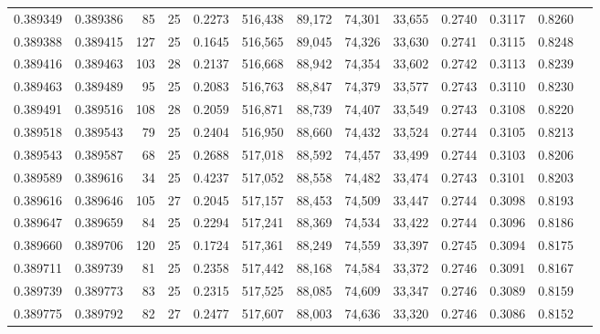 \begin{tabular}{rrrrrrrrrrrrr}
0.389349 & 0.389386 &    85 &  25 &                                     0.2273 & 516,438 &  89,172 &  74,301 &  33,655 & 0.2740 & 0.3117 & 0.8260 \\
0.389388 & 0.389415 &   127 &  25 &                                     0.1645 & 516,565 &  89,045 &  74,326 &  33,630 & 0.2741 & 0.3115 & 0.8248 \\
0.389416 & 0.389463 &   103 &  28 &                                     0.2137 & 516,668 &  88,942 &  74,354 &  33,602 & 0.2742 & 0.3113 & 0.8239 \\
0.389463 & 0.389489 &    95 &  25 &                                     0.2083 & 516,763 &  88,847 &  74,379 &  33,577 & 0.2743 & 0.3110 & 0.8230 \\
0.389491 & 0.389516 &   108 &  28 &                                     0.2059 & 516,871 &  88,739 &  74,407 &  33,549 & 0.2743 & 0.3108 & 0.8220 \\
0.389518 & 0.389543 &    79 &  25 &                                     0.2404 & 516,950 &  88,660 &  74,432 &  33,524 & 0.2744 & 0.3105 & 0.8213 \\
0.389543 & 0.389587 &    68 &  25 &                                     0.2688 & 517,018 &  88,592 &  74,457 &  33,499 & 0.2744 & 0.3103 & 0.8206 \\
0.389589 & 0.389616 &    34 &  25 &                                     0.4237 & 517,052 &  88,558 &  74,482 &  33,474 & 0.2743 & 0.3101 & 0.8203 \\
0.389616 & 0.389646 &   105 &  27 &                                     0.2045 & 517,157 &  88,453 &  74,509 &  33,447 & 0.2744 & 0.3098 & 0.8193 \\
0.389647 & 0.389659 &    84 &  25 &                                     0.2294 & 517,241 &  88,369 &  74,534 &  33,422 & 0.2744 & 0.3096 & 0.8186 \\
0.389660 & 0.389706 &   120 &  25 &                                     0.1724 & 517,361 &  88,249 &  74,559 &  33,397 & 0.2745 & 0.3094 & 0.8175 \\
0.389711 & 0.389739 &    81 &  25 &                                     0.2358 & 517,442 &  88,168 &  74,584 &  33,372 & 0.2746 & 0.3091 & 0.8167 \\
0.389739 & 0.389773 &    83 &  25 &                                     0.2315 & 517,525 &  88,085 &  74,609 &  33,347 & 0.2746 & 0.3089 & 0.8159 \\
0.389775 & 0.389792 &    82 &  27 &                                     0.2477 & 517,607 &  88,003 &  74,636 &  33,320 & 0.2746 & 0.3086 & 0.8152 \\

\end{tabular}
